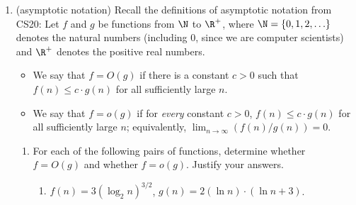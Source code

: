 \documentclass[11pt]{article}
\begin{document}
\begin{enumerate}
\begin{enumerate}
 Answer:

Given a vertex v, the program recursively runs on the children of the input vertex, with an input vertex with no children returning 1. This effectively counts all of the vertices, and each vertex is taken as an input to the function exactly once, the run-time of this function is just the number of vertices.


    \item (proofs by induction) Let $t$ be a positive integer. Prove that every binary tree $\treeT$ of size at least $2t+1$ has a vertex $\btv$ such that the subtree rooted at $\btv$ has size at least $t$ and at most $2t-1$.  (Hint: use strong induction on the size $n$ of $\treeT$, starting with base case $n=2t+1$.  Remember that nodes in binary trees can have 2, 1, or 0 children.) \label{part:induction-tsize}
    

    \item (from proofs to algorithms) Turn your proof from Part~\ref{part:induction-tsize} into a Python program \texttt{FindDescendantOfSize(t,v)} that, given a positive integer $\texttt{t}$ and a vertex \texttt{v} of a {\em size-augmented} tree \treeT\ such that $\texttt{v.size}\geq \texttt{2t+1}$, finds and returns a descendant  \texttt{w} of $\texttt{v}$ such that $\texttt{t}\leq \texttt{w.size} \leq \texttt{2t-1}$.   Your algorithm should run in time $O(h)$, where $h$ is the height of the subtree rooted at $\texttt{v}$; explain in words why this is the case.


\end{enumerate}


\item (asymptotic notation) Recall the definitions of asymptotic notation from CS20:
Let $f$ and $g$ be functions from $\N$ to $\R^+$, where $\N=\{0,1,2,\ldots\}$ denotes the natural numbers (including 0, since we are computer scientists) and $\R^+$ denotes the positive real numbers.
\begin{itemize}
    \item We say that $f=O(g)$ if there is a constant $c>0$ such that $f(n)\leq c\cdot g(n)$ for all sufficiently large $n$.
    \item We say that $f=o(g)$ if for {\em every} constant $c>0$, $f(n)\leq c\cdot g(n)$ for all sufficiently large $n$; equivalently, $\lim_{n\rightarrow \infty} (f(n)/g(n))=0$.

\end{itemize}


\begin{enumerate}
    \item For each of the following pairs of functions, determine whether $f=O(g)$ and whether $f=o(g)$.  Justify your answers.
    \begin{enumerate}
        \item $f(n) = 3(\log_2 n)^{3/2}$, $g(n) = 2(\ln n)\cdot (\ln n+3)$.



\end{enumerate}
\end{enumerate}
\end{enumerate}
\end{document}
